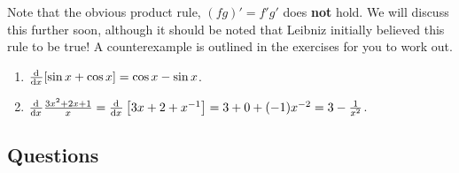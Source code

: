 Note that the obvious product rule, $ (fg)' = f'g' $ does \textbf{not} hold. We will discuss this further soon,
although it should be noted that Leibniz initially believed this rule to be true! A counterexample is outlined in the
exercises for you to work out.

\begin{ex}\leavevmode
  \begin{enumerate}
    \item $ \od{}{x} [\sin x + \cos x] = \cos x - \sin x $.
    \item $ \od{}{x} \frac{3x^2 + 2x + 1}{x} = \od{}{x} \left[ 3x + 2 + x^{-1} \right] = 3 + 0 + (-1)x^{-2} = 3 - \frac{1}{x^2} $.
  \end{enumerate}
\end{ex}

\clearpage
\subsection*{Questions}

